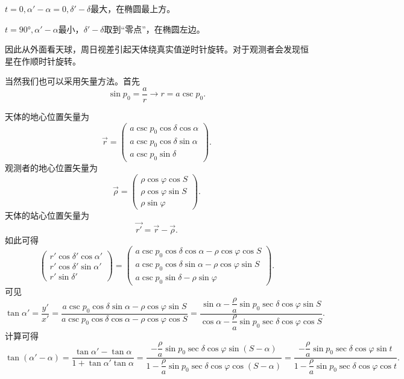 \documentclass[11pt, a4paper, oneside]{ctexart}
\numberwithin{equation}{subsection}
\begin{document}
$t=0,\alpha'-\alpha=0,\delta'-\delta$最大，在椭圆最上方。

$t=\ang{90;;},\alpha'-\alpha$最小，$\delta'-\delta$取到“零点”，在椭圆左边。

因此从外面看天球，周日视差引起天体绕真实值逆时针旋转。对于观测者会发现恒星在作顺时针旋转。

当然我们也可以采用矢量方法。首先
\begin{equation}
\sin p_0=\frac{a}{r}\to r=a\csc p_0.
\end{equation}

天体的地心位置矢量为
\begin{equation}
\vec r=\begin{pmatrix}
a\csc p_0\cos\delta\cos\alpha\\
a\csc p_0\cos\delta\sin\alpha\\
a\csc p_0\sin\delta
\end{pmatrix}.
\end{equation}
观测者的地心位置矢量为
\begin{equation}
\vec\rho=\begin{pmatrix}
\rho\cos\varphi\cos S\\
\rho\cos\varphi\sin S\\
\rho\sin\varphi
\end{pmatrix}.
\end{equation}
天体的站心位置矢量为
\begin{equation}
\vec{r'}=\vec r-\vec\rho.
\end{equation}
如此可得
\begin{equation}
\begin{pmatrix}
r'\cos\delta'\cos\alpha'\\
r'\cos\delta'\sin\alpha'\\
r'\sin\delta'
\end{pmatrix}=
\begin{pmatrix}
a\csc p_0\cos\delta\cos\alpha-\rho\cos\varphi\cos S\\
a\csc p_0\cos\delta\sin\alpha-\rho\cos\varphi\sin S\\
a\csc p_0\sin\delta-\rho\sin\varphi
\end{pmatrix}.
\end{equation}
可见
\begin{equation}
\tan\alpha'=\frac{y'}{x'}=\frac{a\csc p_0\cos\delta\sin\alpha-\rho\cos\varphi\sin S}{a\csc p_0\cos\delta\cos\alpha-\rho\cos\varphi\cos S}=\frac{\sin\alpha-\dfrac{\rho}{a}\sin p_0\sec\delta\cos\varphi\sin S}{\cos\alpha-\dfrac{\rho}{a}\sin p_0\sec\delta\cos\varphi\cos S}.
\end{equation}
计算可得
\begin{equation}
\tan{\left(\alpha'-\alpha\right)}=\frac{\tan\alpha'-\tan\alpha}{1+\tan\alpha'\tan\alpha}=\frac{-\dfrac{\rho}{a}\sin p_0\sec\delta\cos\varphi\sin\left(S-\alpha\right)}{1-\dfrac{\rho}{a}\sin p_0\sec\delta\cos\varphi\cos\left(S-\alpha\right)}=\frac{-\dfrac{\rho}{a}\sin p_0\sec\delta\cos\varphi\sin t}{1-\dfrac{\rho}{a}\sin p_0\sec\delta\cos\varphi\cos t}.
\end{equation}
\end{document}
